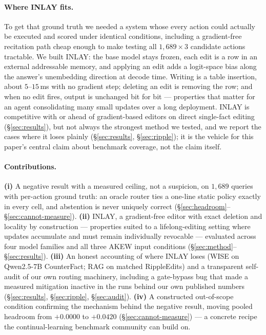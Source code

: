 \documentclass{article}
\begin{document}
\paragraph{Where INLAY fits.} To get that ground truth we needed a system
whose every action could actually be executed and scored under identical
conditions, including a gradient-free recitation path cheap enough to make
testing all $1{,}689 \times 3$ candidate actions tractable. We built INLAY:
the base model stays frozen, each edit is a row in an external addressable
memory, and applying an edit adds a logit-space bias along the answer's
unembedding direction at decode time. Writing is a table insertion, about
$5$--$15$\,ms with no gradient step; deleting an edit is removing the row;
and when no edit fires, output is unchanged bit for bit --- properties
that matter for an agent consolidating many small updates over a long
deployment. INLAY is competitive with or ahead of gradient-based editors on
direct single-fact editing (\S\ref{sec:results}), but not always the
strongest method we tested, and we report the cases where it loses plainly
(\S\ref{sec:results}, \S\ref{sec:ripple}); it is the vehicle for this
paper's central claim about benchmark coverage, not the claim itself.

\paragraph{Contributions.}
\textbf{(i)} A negative result with a measured ceiling, not a suspicion, on
$1{,}689$ queries with per-action ground truth: an oracle router ties a
one-line static policy exactly in every cell, and abstention is never
uniquely correct (\S\ref{sec:headroom}--\S\ref{sec:cannot-measure}).
\textbf{(ii)} INLAY, a gradient-free editor with exact deletion and locality
by construction --- properties suited to a lifelong-editing setting where
updates accumulate and must remain individually revocable --- evaluated
across four model families and all three AKEW input conditions
(\S\ref{sec:method}--\S\ref{sec:results}).
\textbf{(iii)} An honest accounting of where INLAY loses (WISE on
Qwen2.5-7B CounterFact; RAG on matched RippleEdits) and a transparent
self-audit of our own routing machinery, including a gate-bypass bug that
made a measured mitigation inactive in the runs behind our own published
numbers (\S\ref{sec:results}, \S\ref{sec:ripple}, \S\ref{sec:audit}).
\textbf{(iv)} A constructed out-of-scope condition confirming the mechanism
behind the negative result, moving pooled headroom from $+0.0000$ to
$+0.0420$ (\S\ref{sec:cannot-measure}) --- a concrete recipe the
continual-learning benchmark community can build on.
\end{document}

